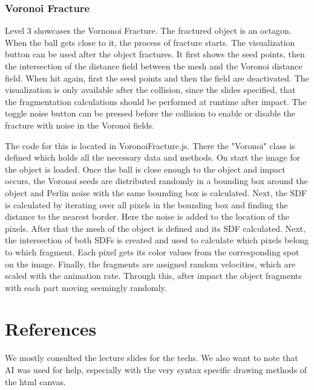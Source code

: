 \documentclass{article}
\begin{document}
\subsubsection{Voronoi Fracture}
Level 3 showcases the Vornonoi Fracture. The fractured object is an octagon. When the ball gets close to it, the process of fracture starts. The visualization button can be used after the object fractures. It first shows the seed points, then the intersection of the distance field between the mesh and the Voronoi distance field. When hit again, first the seed points and then the field are deactivated. The visualization is only available after the collision, since the slides specified, that the fragmentation calculations should be performed at runtime after impact. The toggle noise button can be pressed before the collision to enable or disable the fracture with noise in the Voronoi fields.

The code for this is located in VoronoiFracture.js. There the "Voronoi" class is defined which holds all the necessary data and methods. On start the image for the object is loaded. Once the ball is close enough to the object and impact occurs, the Voronoi seeds are distributed randomly in a bounding box around the object and Perlin noise with the same bounding box is calculated. Next, the SDF is calculated by iterating over all pixels in the bounding box and finding the distance to the nearest border. Here the noise is added to the location of the pixels. After that the mesh of the object is defined and its SDF calculated. Next, the intersection of both SDFs is created and used to calculate which pixels belong to which fragment. Each pixel gets its color values from the corresponding spot on the image. Finally, the fragments are assigned random velocities, which are scaled with the animation rate. Through this, after impact the object fragments with each part moving seemingly randomly.

\section{References}

We mostly consulted the lecture slides for the techs. We also want to note that AI was 
used for help, especially with the very syntax specific drawing methods of the html canvas.
\end{document}

